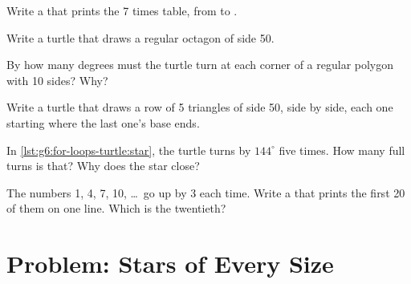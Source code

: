 \begin{exercise}[$\star\star$]\label{exo:g6:for-loops-turtle:7}
Write a  that prints the 7 times table, from  to
.
\end{exercise}

\begin{exercise}[$\star\star$]\label{exo:g6:for-loops-turtle:8}
Write a turtle  that draws a regular octagon of side 50.
\end{exercise}

\begin{exercise}[$\star\star$]\label{exo:g6:for-loops-turtle:9}
By how many degrees must the turtle turn at each corner of a regular polygon
with 10 sides? Why?
\end{exercise}

\begin{exercise}[$\star\star\star$]\label{exo:g6:for-loops-turtle:10}
Write a turtle  that draws a row of 5 triangles of side 50, side by side,
each one starting where the last one's base ends.
\end{exercise}

\begin{exercise}[$\star\star\star$]\label{exo:g6:for-loops-turtle:11}
In \cref{lst:g6:for-loops-turtle:star}, the turtle turns by $144^\circ$ five
times. How many full turns is that? Why does the star close?
\end{exercise}

\begin{exercise}[$\star\star\star$]\label{exo:g6:for-loops-turtle:12}
The numbers 1, 4, 7, 10, \dots\ go up by 3 each time. Write a  that
prints the first 20 of them on one line. Which is the twentieth?
\end{exercise}

\section{Problem: Stars of Every Size}


